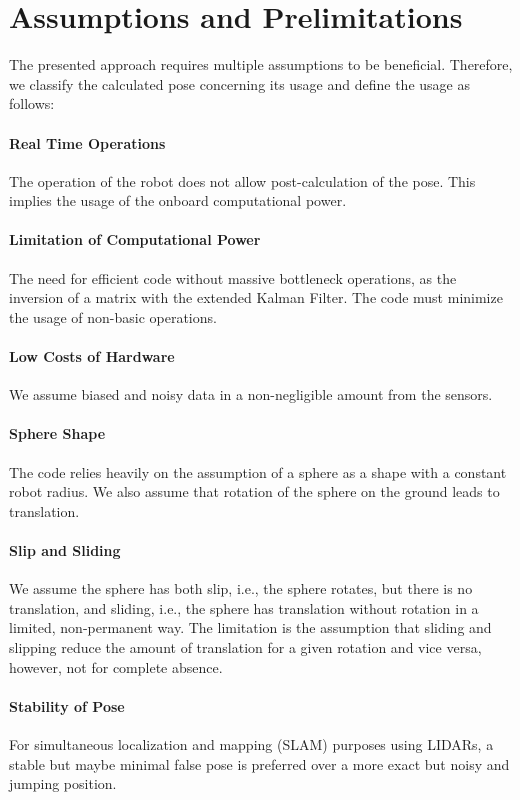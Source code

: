 \documentclass[letterpaper, 10 pt, conference]{ieeeconf}  %
\begin{document}
\section{Assumptions and Prelimitations}
\label{AssumptionsAndPrelimitations}
The presented approach requires multiple assumptions to be beneficial. Therefore, we classify the calculated pose concerning its usage and define the usage as follows:

\paragraph*{Real Time Operations}The operation of the robot does not allow post-calculation of the pose. This implies the usage of the onboard computational power.
\paragraph*{Limitation of Computational Power}
The need for efficient code without massive bottleneck operations, as the inversion of a matrix with the extended Kalman Filter. The code must minimize the usage of non-basic operations.
\paragraph*{Low Costs of Hardware}
We assume biased and noisy data in a non-negligible amount from the sensors.
\paragraph*{Sphere Shape}
The code relies heavily on the assumption of a sphere as a shape with a constant robot radius. We also assume that rotation of the sphere on the ground leads to translation.
\paragraph*{Slip and Sliding}
We assume the sphere has both slip, i.e., the sphere rotates, but there is no translation, and sliding, i.e., the sphere has translation without rotation in a limited, non-permanent way. The limitation is the assumption that sliding and slipping reduce the amount of translation for a given rotation and vice versa, however, not for complete absence.
\paragraph*{Stability of Pose}
For simultaneous localization and mapping (SLAM) purposes using LIDARs, a stable but maybe minimal false pose is preferred over a more exact but noisy and jumping position.
\end{document}
